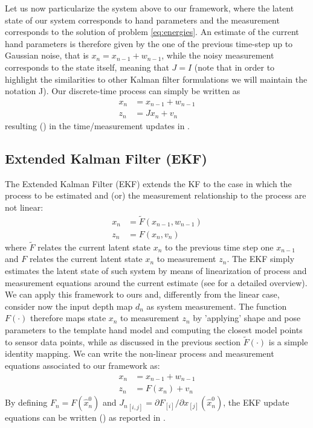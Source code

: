 Let us now particularize the system above to our framework, where the latent state of our system corresponds to hand parameters and the measurement corresponds to the solution of problem \eqref{eq:energies}.
An estimate of the current hand parameters is therefore given by the one of the previous time-step up to Gaussian noise, that is $x_n = x_{n-1} + w_{n-1}$, while the noisy measurement corresponds to the state itself, meaning that $J = I$ (note that in order to highlight the similarities to other Kalman filter formulations we will maintain the notation J). Our discrete-time process can simply be written as
% 
\begin{align}
x_n &= x_{n - 1} + w_{n - 1} \\
z_n &= J x_n + v_n
\end{align}
% 
resulting (\cite{welch1995introduction}) in the time/measurement updates in .

\subsection{Extended Kalman Filter (EKF)}
\label{app:ekf}
The Extended Kalman Filter (EKF) extends the KF to the case in which the process to be estimated and (or) the measurement relationship to the process are not linear:
% 
\begin{align}
x_n &= \tilde{F}(x_{n - 1},  w_{n - 1}) \\
z_n &= F(x_n, v_n)
\end{align}
% 
where $\tilde{F}$ relates the current latent state $ x _n$ to the previous time step one $ x _{n-1}$ and $F$ relates the current latent state $ x _n$ to measurement $ z _n$.
The EKF simply estimates the latent state of such system by means of linearization of process and measurement equations around the current estimate (see \cite{welch1995introduction} for a detailed overview).
We can apply this framework to ours and, differently from the linear case, consider now the input depth map $d_n$ as system measurement. The function $F(\cdot)$ therefore maps state $x_n$ to measurement $z_n$ by 'applying' shape and pose parameters to the template hand model and computing the closest model points to sensor data points, while as discussed in the previous section $\tilde{F}(\cdot)$ is a simple identity mapping.
We can write the non-linear process and measurement equations associated to our framework as:
% 
\begin{align}
	x_n &= x_{n - 1} + w_{n - 1} \\
	z_n &= F(x_n) + v_n 
\end{align}
%
By defining $F_n = F(\hat{x}_n^0)$ and ${J_n}_{[i, j]} = \partial F_{[i]} / \partial x_{[j]}(\hat{x}_n^0)$, the EKF update equations can be written (\cite{welch1995introduction}) as reported in .
%


